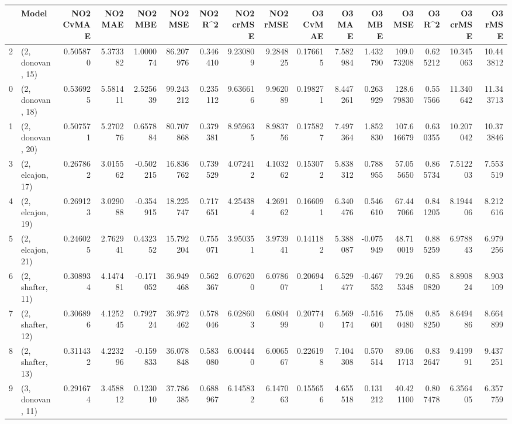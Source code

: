 \begin{tabular}{llrrrrrrrrrrrrrr}
\toprule
{} &             Model &  NO2 CvMAE &   NO2 MAE &   NO2 MBE &    NO2 MSE &   NO2 R\textasciicircum2 &  NO2 crMSE &  NO2 rMSE &  O3 CvMAE &    O3 MAE &    O3 MBE &      O3 MSE &    O3 R\textasciicircum2 &   O3 crMSE &    O3 rMSE \\
\midrule
2  &  (2, donovan, 15) &   0.505870 &  5.373382 &  1.000074 &  86.207976 &  0.346410 &   9.230809 &  9.284825 &  0.176615 &  7.582984 &  1.432790 &  109.073208 &  0.625212 &  10.345063 &  10.443812 \\
0  &  (2, donovan, 18) &   0.536925 &  5.581411 &  2.525639 &  99.243212 &  0.235112 &   9.636616 &  9.962089 &  0.198271 &  8.447261 &  0.263929 &  128.679830 &  0.557566 &  11.340642 &  11.343713 \\
1  &  (2, donovan, 20) &   0.507571 &  5.270276 &  0.657884 &  80.707868 &  0.379381 &   8.959635 &  8.983756 &  0.175827 &  7.497364 &  1.852830 &  107.616679 &  0.630355 &  10.207042 &  10.373846 \\
3  &  (2, elcajon, 17) &   0.267862 &  3.015562 & -0.502215 &  16.836762 &  0.739529 &   4.072412 &  4.103262 &  0.153072 &  5.838312 &  0.788955 &   57.055650 &  0.865734 &   7.512203 &   7.553519 \\
4  &  (2, elcajon, 19) &   0.269123 &  3.029088 & -0.354915 &  18.225747 &  0.717651 &   4.254384 &  4.269162 &  0.166091 &  6.340476 &  0.546610 &   67.447066 &  0.841205 &   8.194406 &   8.212616 \\
5  &  (2, elcajon, 21) &   0.246025 &  2.762941 &  0.432352 &  15.792204 &  0.755071 &   3.950351 &  3.973941 &  0.141182 &  5.388087 & -0.075949 &   48.710019 &  0.885259 &   6.978843 &   6.979256 \\
6  &  (2, shafter, 11) &   0.308934 &  4.147481 & -0.171052 &  36.949468 &  0.562367 &   6.076200 &  6.078607 &  0.206941 &  6.529477 & -0.467552 &   79.265348 &  0.850820 &   8.890824 &   8.903109 \\
7  &  (2, shafter, 12) &   0.306896 &  4.125245 &  0.792724 &  36.972462 &  0.578046 &   6.028603 &  6.080499 &  0.207740 &  6.569174 & -0.516601 &   75.080480 &  0.858250 &   8.649486 &   8.664899 \\
8  &  (2, shafter, 13) &   0.311432 &  4.223296 & -0.159833 &  36.078848 &  0.583080 &   6.004440 &  6.006567 &  0.226198 &  7.104308 &  0.570514 &   89.061713 &  0.832647 &   9.419991 &   9.437251 \\
9  &  (3, donovan, 11) &   0.291674 &  3.458812 &  0.123010 &  37.786385 &  0.688967 &   6.145832 &  6.147063 &  0.155656 &  4.655518 &  0.131212 &   40.421100 &  0.807478 &   6.356405 &   6.357759 \\

\end{tabular}
